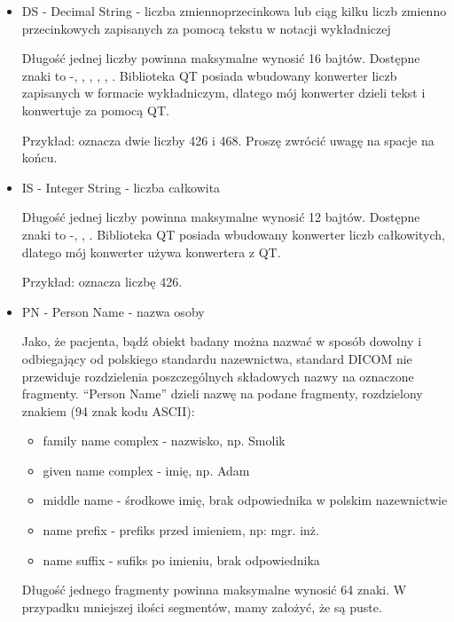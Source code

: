 \begin{itemize}
    \item DS - Decimal String - liczba zmiennoprzecinkowa lub ciąg kilku liczb zmienno przecinkowych zapisanych za pomocą tekstu w notacji wykładniczej

          Długość jednej liczby powinna maksymalne wynosić 16 bajtów.
          Dostępne znaki to -, \dataword{+}, \dataword{-}, , , .
          Biblioteka QT posiada wbudowany konwerter liczb zapisanych w formacie wykładniczym, dlatego mój konwerter dzieli tekst i konwertuje za pomocą QT.

          Przykład:  oznacza dwie liczby 426 i 468. Proszę zwrócić uwagę na spacje na końcu.

    \item IS - Integer String - liczba całkowita

          Długość jednej liczby powinna maksymalne wynosić 12 bajtów.
          Dostępne znaki to -, \dataword{+}, \dataword{-}.
          Biblioteka QT posiada wbudowany konwerter liczb całkowitych, dlatego mój konwerter używa konwertera z QT.

          Przykład:   oznacza liczbę 426.

    \item PN - Person Name - nazwa osoby

          Jako, że pacjenta, bądź obiekt badany można nazwać w sposób dowolny i odbiegający od polskiego standardu nazewnictwa, standard DICOM nie przewiduje rozdzielenia poszczególnych składowych nazwy na oznaczone fragmenty.
          \enquote{Person Name} dzieli nazwę na podane fragmenty, rozdzielony znakiem \dataword{\^{}} (94 znak kodu ASCII):
          \begin{itemize}
              \item family name complex - nazwisko, np. Smolik
              \item given name complex - imię, np. Adam
              \item middle name - środkowe imię, brak odpowiednika w polskim nazewnictwie
              \item name prefix - prefiks przed imieniem, np: mgr. inż.
              \item name suffix - sufiks po imieniu, brak odpowiednika
          \end{itemize}
          Długość jednego fragmenty powinna maksymalne wynosić 64 znaki.
          W przypadku mniejszej ilości segmentów, mamy założyć, że są puste.


\end{itemize}
